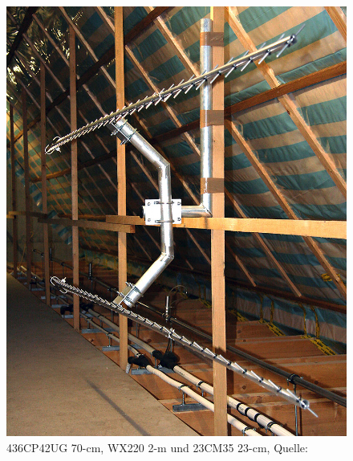\begin{figure}[h]
\begin{minipage}[t]{0.2\textwidth}
		\includegraphics[width=\textwidth]{images/antenne3}
	\end{minipage}
	\caption[Antennen]{436CP42UG 70-cm, WX220 2-m und 23CM35 23-cm, Quelle: \cite{dk0te}}
	\label{fig: antennen}
\end{figure}

\clearpage

